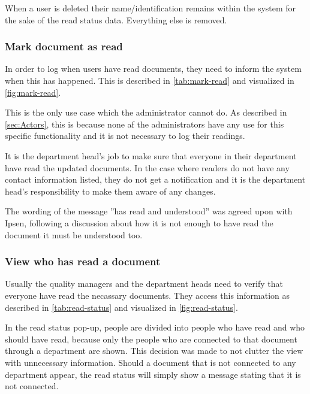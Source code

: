When a user is deleted their name/identification remains within the system for the sake of the read status data.
Everything else is removed.

\subsubsection{Mark document as read}\label{sec:mark-read}
In order to log when users have read documents, they need to inform the system when this has happened.
This is described in \cref{tab:mark-read} and visualized in \cref{fig:mark-read}.




This is the only use case which the administrator cannot do.
As described in \cref{sec:Actors}, this is because none af the administrators have any use for this specific functionality and it is not necessary to log their readings.

It is the department head's job to make sure that everyone in their department have read the updated documents.
In the case where readers do not have any contact information listed, they do not get a notification and it is the department head's responsibility to make them aware of any changes.

The wording of the message ''has read and understood'' was agreed upon with Ipsen, following a discussion about how it is not enough to have read the document it must be understood too.

\subsubsection{View who has read a document}
Usually the quality managers and the department heads need to verify that everyone have read the necassary documents.
They access this information as described in \cref{tab:read-status} and visualized in \cref{fig:read-status}.




In the read status pop-up, people are divided into people who have read and who should have read, because only the people who are connected to that document through a department are shown.
This decision was made to not clutter the view with unnecessary information.
Should a document that is not connected to any department appear, the read status will simply show a message stating that it is not connected.

